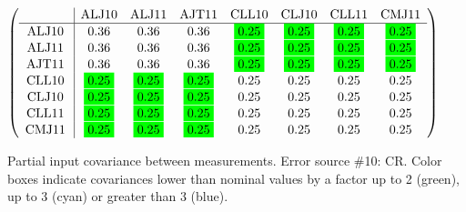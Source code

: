 \begin{table}[H]
\scriptsize
\begin{center}
\renewcommand{\arraystretch}{1.1}
\begin{math}\left(\begin{array}{c|ccccccc}
 & \mathrm{ALJ10} & 
\mathrm{ALJ11} & 
\mathrm{AJT11} & 
\mathrm{CLL10} & 
\mathrm{CLJ10} & 
\mathrm{CLL11} & 
\mathrm{CMJ11} \\
\hline
\mathrm{ALJ10} \hspace*{2pt} &       0.36 &       0.36 &       0.36 &  \colorbox{Green1}{$      0.25$} &  \colorbox{Green1}{$      0.25$} &  \colorbox{Green1}{$      0.25$} &  \colorbox{Green1}{$      0.25$} \\
\mathrm{ALJ11} \hspace*{2pt} &       0.36 &       0.36 &       0.36 &  \colorbox{Green1}{$      0.25$} &  \colorbox{Green1}{$      0.25$} &  \colorbox{Green1}{$      0.25$} &  \colorbox{Green1}{$      0.25$} \\
\mathrm{AJT11} \hspace*{2pt} &       0.36 &       0.36 &       0.36 &  \colorbox{Green1}{$      0.25$} &  \colorbox{Green1}{$      0.25$} &  \colorbox{Green1}{$      0.25$} &  \colorbox{Green1}{$      0.25$} \\
\mathrm{CLL10} \hspace*{2pt} &  \colorbox{Green1}{$      0.25$} &  \colorbox{Green1}{$      0.25$} &  \colorbox{Green1}{$      0.25$} &       0.25 &       0.25 &       0.25 &       0.25 \\
\mathrm{CLJ10} \hspace*{2pt} &  \colorbox{Green1}{$      0.25$} &  \colorbox{Green1}{$      0.25$} &  \colorbox{Green1}{$      0.25$} &       0.25 &       0.25 &       0.25 &       0.25 \\
\mathrm{CLL11} \hspace*{2pt} &  \colorbox{Green1}{$      0.25$} &  \colorbox{Green1}{$      0.25$} &  \colorbox{Green1}{$      0.25$} &       0.25 &       0.25 &       0.25 &       0.25 \\
\mathrm{CMJ11} \hspace*{2pt} &  \colorbox{Green1}{$      0.25$} &  \colorbox{Green1}{$      0.25$} &  \colorbox{Green1}{$      0.25$} &       0.25 &       0.25 &       0.25 &       0.25 \\
\end{array}\right)\end{math}
\caption{Partial input covariance between measurements. Error source \#10: CR. Color boxes indicate covariances lower than nominal values by a factor up to 2 (green), up to 3 (cyan) or greater than 3 (blue).}
\renewcommand{\arraystretch}{1}
\end{center}
\end{table}
